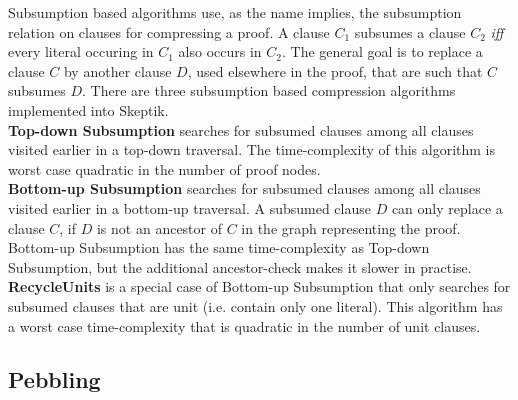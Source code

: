\documentclass{llncs}
\begin{document}
Subsumption based algorithms use, as the name implies, the subsumption relation on clauses for compressing a proof. A clause $C_1$ subsumes a clause $C_2$ \textit{iff} every literal occuring in $C_1$ also occurs in $C_2$.
The general goal is to replace a clause $C$ by another clause $D$, used elsewhere in the proof, that are such that $C$ subsumes $D$.
There are three subsumption based compression algorithms implemented into Skeptik.\\
\textbf{Top-down Subsumption} searches for subsumed clauses among all clauses visited earlier in a top-down traversal. The time-complexity of this algorithm is worst case quadratic in the number of proof nodes.\\
\textbf{Bottom-up Subsumption} searches for subsumed clauses among all clauses visited earlier in a bottom-up traversal. A subsumed clause $D$ can only replace a clause $C$, if $D$ is not an ancestor of $C$ in the graph representing the proof. Bottom-up Subsumption has the same time-complexity as Top-down Subsumption, but the additional ancestor-check makes it slower in practise.\\
\textbf{RecycleUnits} \cite{RP11} is a special case of Bottom-up Subsumption that only searches for subsumed clauses that are unit (i.e. contain only one literal). This algorithm has a worst case time-complexity that is quadratic in the number of unit clauses.

\subsection{Pebbling}
\end{document}
